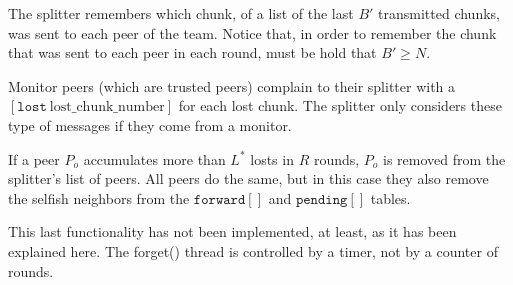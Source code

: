 

\label{sec:free_riding_control}

The splitter remembers which chunk, of a list of the last $B'$
transmitted chunks, was sent to each peer of the team. Notice that, in
order to remember the chunk that was sent to each peer in each round,
must be hold that $B'\ge N$. 

Monitor peers (which are trusted peers) complain to their splitter
with a $[\mathtt{lost}~\text{lost\_chunk\_number}]$ for each lost
chunk. The splitter only considers these type of messages if they come
from a monitor.

If a peer $P_o$ accumulates more than $L^*$ losts in $R$ rounds, $P_o$
is removed from the splitter's list of peers. All peers do the same,
but in this case they also remove the selfish neighbors from the
$\mathtt{forward}[]$ and $\mathtt{pending}[]$ tables.


\begin{notex}
This last functionality has not been implemented, at least, as it has
been explained here. The forget() thread is controlled by a timer, not
by a counter of rounds.
\end{notex}

